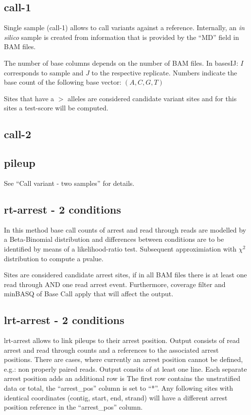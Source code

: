 \documentclass[10pt,a4paper]{article}
\begin{document}
\subsection{call-1}
Single sample (call-1) allows to call variants against a reference. 
Internally, an \textit{in silico} sample is created from information that is provided by the ``MD'' field 
in BAM files.

The number of base columns depends on the number of BAM files. In basesIJ: $I$
corresponds to sample and $J$ to the respective replicate. Numbers indicate the base count of the
following base vector: $(A, C, G, T)$

Sites that have a $>$ alleles are considered candidate variant sites and for this sites a test-score will be computed.
\subsection{call-2}
\subsection{pileup}
See ``Call variant - two samples'' for details.
\subsection{rt-arrest - 2 conditions}
In this method base call counts of arrest and read through reads are modelled by a Beta-Binomial distribution and 
differences between conditions are to be identified by means of a likelihood-ratio test. Subsequent approximiation 
with $\chi^2$ distribution to compute a pvalue.

Sites are considered candidate arrest sites, if in all BAM files there is at least one read through AND one  
read arrest event. Furthermore, coverage filter and minBASQ of Base Call apply that will affect the output. 
\subsection{lrt-arrest - 2 conditions}
lrt-arrest allows to link pileups to their arrest position. Output consists of read arrest and read through counts and 
a references to the associated arrest positions. There are cases, where currently an arrest position cannot be defined, 
e.g.: non properly paired reads.
Output consits of at least one line. Each separate arrest position adds an additional row is 
The first row contains the unstratified data or total, the ``arrest\_pos'' column is set to ``*''.
Any following sites with identical coordinates (contig, start, end, strand) will have a different 
arrest position reference in the ``arrest\_pos'' column. 
\end{document}
